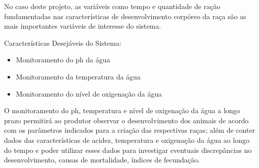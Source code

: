 No caso deste projeto, as variáveis como tempo e quantidade de ração fundamentadas nas características de desenvolvimento corpóreo da raça são as mais importantes variáveis de interesse do sistema.

Características Desejáveis do Sistema:
\begin{itemize}
  \item Monitoramento do ph da água
  \item Monitoramento da temperatura da água
  \item Monitoramento do nível de oxigenação da água
\end{itemize}

O monitoramento do ph, temperatura e nível de oxigenação da água a longo prazo permitirá ao produtor observar o desenvolvimento dos animais de acordo com os parâmetros indicados para a criação das respectivas raças; além de conter dados das características de acidez, temperatura e oxigenação da água ao longo do tempo e poder utilizar esses dados para investigar eventuais discrepâncias no desenvolvimento, causas de mortalidade, índices de fecundação.
